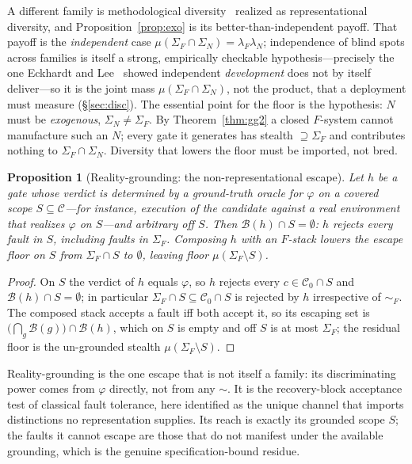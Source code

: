 \documentclass[11pt]{article}
\newtheorem{proposition}{Proposition}
\theoremstyle{definition}
\theoremstyle{remark}
\newcommand{\C}{\mathcal{C}}
\newcommand{\Cbad}{\C_{0}}
\newcommand{\simF}{\sim_{F}}
\newcommand{\SigF}{\Sigma_{F}}
\newcommand{\SigN}{\Sigma_{N}}
\newcommand{\lF}{\lambda_{F}}
\newcommand{\lN}{\lambda_{N}}
\newcommand{\B}{\mathcal{B}}
\begin{document}
\noindent A different family is methodological diversity~\cite{littlewood1989} realized as
representational diversity, and Proposition~\ref{prop:exo} is its better-than-independent payoff. That
payoff is the \emph{independent} case $\mu(\SigF\cap\SigN)=\lF\lN$; independence of blind spots across
families is itself a strong, empirically checkable hypothesis---precisely the one Eckhardt and
Lee~\cite{eckhardt1985} showed independent \emph{development} does not by itself deliver---so it is the
joint mass $\mu(\SigF\cap\SigN)$, not the product, that a deployment must measure (\S\ref{sec:disc}).
The essential point for the floor is the hypothesis: $N$ must be \emph{exogenous}, $\SigN\neq\SigF$.
By Theorem~\ref{thm:gg2} a closed $F$-system cannot manufacture such an $N$; every gate it generates
has stealth $\supseteq\SigF$ and contributes nothing to $\SigF\cap\SigN$. Diversity that lowers the
floor must be imported, not bred.

\begin{proposition}[Reality-grounding: the non-representational escape]\label{prop:ground}
Let $h$ be a gate whose verdict is determined by a ground-truth oracle for $\varphi$ on a covered
scope $S\subseteq\C$---for instance, execution of the candidate against a real environment that
realizes $\varphi$ on $S$---and arbitrary off $S$. Then $\B(h)\cap S=\emptyset$: $h$ rejects every
fault in $S$, including faults in $\SigF$. Composing $h$ with an $F$-stack lowers the escape floor on
$S$ from $\SigF\cap S$ to $\emptyset$, leaving floor $\mu(\SigF\setminus S)$.
\end{proposition}

\begin{proof}
On $S$ the verdict of $h$ equals $\varphi$, so $h$ rejects every $c\in\Cbad\cap S$ and
$\B(h)\cap S=\emptyset$; in particular $\SigF\cap S\subseteq\Cbad\cap S$ is rejected by $h$
irrespective of $\simF$. The composed stack accepts a fault iff both accept it, so its escaping set is
$\big(\bigcap_g\B(g)\big)\cap\B(h)$, which on $S$ is empty and off $S$ is at most $\SigF$; the
residual floor is the un-grounded stealth $\mu(\SigF\setminus S)$.
\end{proof}

\noindent Reality-grounding is the one escape that is not itself a family: its discriminating power
comes from $\varphi$ directly, not from any $\sim$. It is the recovery-block acceptance test
of classical fault tolerance, here identified as the unique channel that imports
distinctions no representation supplies. Its reach is exactly its grounded scope $S$; the faults it
cannot escape are those that do not manifest under the available grounding, which is the genuine
specification-bound residue.
\end{document}
